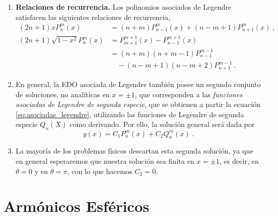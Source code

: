 \begin{propiedad}
\begin{enumerate}[resume=asociadas]
        \item \textbf{Relaciones de recurrencia.} Los polinomios asociados de Legendre satisfacen las siguientes relaciones de recurrencia,
        \begin{align}
            (2n+1)x P_n^m(x) & = (n+m) P^m_{n-1}(x) + (n-m+1) P^m_{n+1}(x) \ , \\
            (2n+1) \sqrt{1-x^2} P_n^m(x) & = P^{m+1}_{m+1}(x) - P^{m+1}_{n-1}(x) \\
            & = (n+m)(n+m-1)P^{m-1}_{n-1} \nonumber \\
            & \quad - (n-m+1)(n-m+2)P^{m-1}_{n+1} \ .
        \end{align}

        \item En general, la EDO asociada de Legendre también posee un segundo conjunto de soluciones, no analíticas en $x = \pm 1$, que corresponden a las \emph{funciones asociadas de Legendre de segunda especie}, que se obtienen a partir la ecuación \eqref{eq:asociadas_legendre}, utilizando las funciones de Legendre de segunda especie $Q_n(X)$ como derivando. Por ello, la solución general será dada por
        \begin{equation}
            y(x) = C_1 P_n^m(x) + C_2 Q_n^m(x) \ .
        \end{equation}

        \item La mayoría de los problemas físicos descartan esta segunda solución, ya que en general esperaremos que nuestra solución sea finita en $x = \pm 1$, es decir, en $\theta = 0$ y en $\theta = \pi$, con lo que hacemos $C_2 = 0$.
    \end{enumerate}
\end{propiedad}

\newpage

\section{Armónicos Esféricos}

